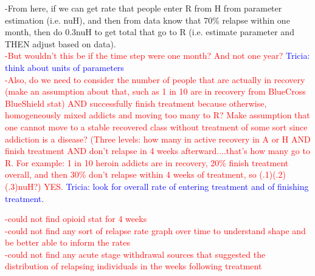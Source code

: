 \documentclass[12pt]{article}
\begin{document}
-From here, if we can get rate that people enter R from H from parameter estimation (i.e. nuH), and then from data know that 70\% relapse within one month, then do 0.3nuH to get total that go to R  (i.e. estimate parameter and THEN adjust based on data).\\ 
\textcolor{red}{-But wouldn't this be if the time step were one month? And not one year? \textcolor{blue}{Tricia: think about units of parameters} \\
-Also, do we need to consider the number of people that are actually in recovery (make an assumption about that, such as 1 in 10 are in recovery from BlueCross BlueShield stat) AND successfully finish treatment because otherwise, homogeneously mixed addicts and moving too many to R? Make assumption that one cannot move to a stable recovered class without treatment of some sort since addiction is a disease? (Three levels: how many in active recovery in A or H AND finish treatment AND don't relapse in 4 weeks afterward....that's how many go to R. For example: 1 in 10 heroin addicts are in recovery, 20\% finish treatment overall, and then 30\% don't relapse within 4 weeks of treatment, so (.1)(.2)(.3)nuH?) YES.} \textcolor{blue}{Tricia: look for overall rate of entering treatment and of finishing treatment.\\}

\textcolor{red}{-could not find opioid stat for 4 weeks \\
-could not find any sort of relapse rate graph over time to understand shape and be better able to inform the rates \\
-could not find any acute stage withdrawal sources that suggested the distribution of relapsing individuals in the weeks following treatment}  \\
\end{document}
